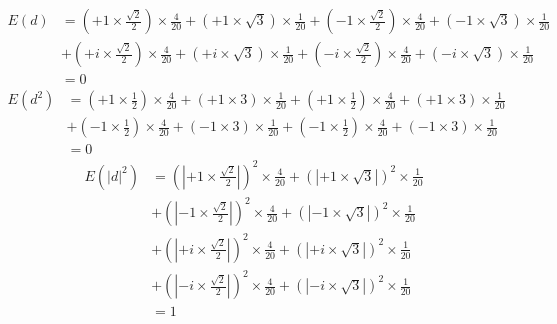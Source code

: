\begin{Proof}
	\begin{equation*}
		\begin{split}
		E(d) &= \left(+1 \times \frac{\sqrt{2}}{2}\right) \times \frac{4}{20} + \left(+1 \times \sqrt{3}\right) \times \frac{1}{20}+\left(-1 \times \frac{\sqrt{2}}{2}\right) \times \frac{4}{20}+\left(-1 \times \sqrt{3}\right) \times \frac{1}{20}\\
		     &+ \left(+i \times \frac{\sqrt{2}}{2}\right) \times \frac{4}{20} + \left(+i \times \sqrt{3}\right) \times \frac{1}{20}+\left(-i \times \frac{\sqrt{2}}{2}\right) \times \frac{4}{20}+\left(-i \times \sqrt{3}\right) \times \frac{1}{20}\\ 
			 &= 0
		\end{split}
	  \end{equation*}
	  \begin{equation*}
		\begin{split}
		E(d^2) &= \left(+1 \times \frac{1}{2}\right) \times \frac{4}{20} + \left(+1 \times 3\right) \times \frac{1}{20}+\left(+1 \times \frac{1}{2}\right) \times \frac{4}{20}+\left(+1 \times 3\right) \times \frac{1}{20}\\
		     &+ \left(-1 \times \frac{1}{2}\right) \times \frac{4}{20} + \left(-1 \times 3\right) \times \frac{1}{20}+\left(-1 \times \frac{1}{2}\right) \times \frac{4}{20}+\left(-1 \times 3\right) \times \frac{1}{20}\\ 
			 &= 0
		\end{split}
	 \end{equation*}
	 \begin{equation*}
		\begin{split}
		E(\left|d\right|^2) &= \left(\left|+1 \times \frac{\sqrt{2}}{2} \right|\right)^2\times \frac{4}{20} + \left(\left|+1 \times \sqrt{3}\right|\right)^2\times \frac{1}{20}\\
		                    &+\left(\left|-1 \times \frac{\sqrt{2}}{2}\right|\right)^2\times \frac{4}{20}+\left(\left|-1 \times \sqrt{3}\right|\right)^2\times \frac{1}{20}\\
		                    &+ \left(\left|+i \times \frac{\sqrt{2}}{2}\right|\right)^2\times \frac{4}{20} + \left(\left|+i \times \sqrt{3}\right|\right)^2\times \frac{1}{20}\\
							&+\left(\left|-i \times \frac{\sqrt{2}}{2}\right|\right)^2\times \frac{4}{20}+\left(\left|-i \times \sqrt{3}\right|\right)^2\times \frac{1}{20}\\ 
			 &= 1
		\end{split}

\end{equation*}
\end{Proof}
